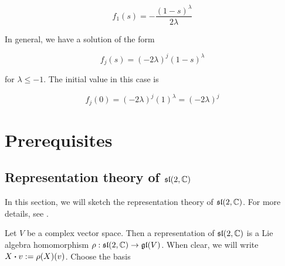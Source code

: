 \documentclass{report}
\newcommand{\su}{\mathfrak{su}}
\renewcommand{\sl}{\mathfrak{sl}}
\begin{document}
\[f_1(s) = -\frac{(1-s)^\lambda}{2\lambda}\]

In general, we have a solution of the form

\[f_j(s) = (-2\lambda)^j(1-s)^\lambda\]

for \(\lambda \le -1\). The initial value in this case is

\[f_j(0) = (-2\lambda)^j(1)^\lambda = (-2\lambda)^j\]







\appendix

\chapter{Prerequisites}

\section{Representation theory of \(\sl(2, \C)\)}

In this section, we will sketch the representation theory of \(\sl(2, \C)\). For more details, see \cite[Section 7]{humphreys}.

Let \(V\) be a complex vector space. Then a representation of \(\sl(2, \C)\) is a Lie algebra homomorphism \(\rho : \sl(2, \C) \to \gl(V)\). When clear, we will write \(X \vdot v := \rho(X)(v)\). Choose the basis
\end{document}
